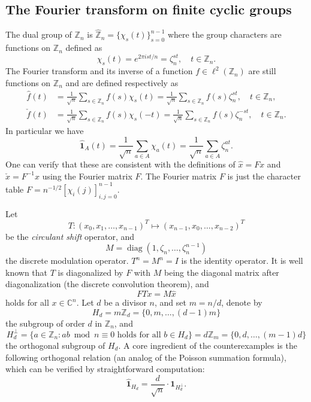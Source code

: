 \documentclass[A4,11pt]{article}
\DeclareMathOperator{\diag}{diag}
\newcommand{\F}[1]{\widehat{\mathbf 1}_{#1}}
\begin{document}
\subsection{The Fourier transform on finite cyclic groups}
The dual group of $\mathbb Z_n$ is $\widehat{\mathbb Z}_n=\{\chi_s(t)\}_{s=0}^{n-1}$ where the group characters are functions on $\mathbb Z_n$ defined as 
$$\chi_s(t)=e^{2\pi i st/n}=\zeta_n^{st}, \quad t\in\mathbb Z_n.$$
The Fourier transform and its inverse of a function $f\in\ell^2(\mathbb Z_n)$ are still functions on $\mathbb Z_n$ and are defined respectively as
\begin{align*}
\hat f(t)&=\frac{1}{\sqrt n}\sum_{s\in\mathbb Z_n}f(s)\chi_s(t)=\frac{1}{\sqrt n}\sum_{s\in\mathbb Z_n}f(s)\zeta_n^{st}, \quad t\in\mathbb Z_n, \\
\check f(t)&=\frac{1}{\sqrt n}\sum_{s\in\mathbb Z_n}f(s)\chi_s(-t)=\frac{1}{\sqrt n}\sum_{s\in\mathbb Z_n}f(s)\zeta_n^{-st}, \quad t\in\mathbb Z_n.
\end{align*}
In particular we have
$$\F{A}(t)=\frac{1}{\sqrt n}\sum_{a\in A}\chi_a(t)=\frac{1}{\sqrt n}\sum_{a\in A}\zeta_n^{at}.$$
One can verify that these are consistent with the definitions of $\hat x=Fx$ and $\check x=F^{-1}x$ using the Fourier matrix $F$. The Fourier matrix $F$ is just the character table $F=n^{-1/2}[\chi_i(j)]_{i,j=0}^{n-1}$.

Let 
$$T:(x_0,x_1,\ldots,x_{n-1})^T\mapsto(x_{n-1},x_0,\ldots,x_{n-2})^T$$ 
be the \emph{circulant shift} operator, and 
$$M=\diag(1,\zeta_n,\ldots,\zeta_n^{n-1})$$ 
the discrete modulation operator. $T^n=M^n=I$ is the identity operator. It is well known that $T$ is diagonalized by $F$ with $M$ being the diagonal matrix after diagonalization (the discrete convolution theorem), and 
\begin{equation} \label{EqTM}
FTx=M\hat x
\end{equation}
holds for all $x\in\mathbb C^n$. Let $d$ be a divisor $n$, and set $m=n/d$, denote by
$$H_d=m\mathbb Z_d=\{0,m,\ldots,(d-1)m\}$$
the subgroup of order $d$ in $\mathbb Z_n$, and 
\begin{equation} \label{EqPerp}
H_d^{\perp}=\{a\in\mathbb Z_n: ab \bmod n\equiv 0 \text{ holds for all } b\in H_d\}=d\mathbb Z_m=\{0,d,\ldots,(m-1)d\}
\end{equation}
the orthogonal subgroup of $H_d$. A core ingredient of the counterexamples is the following orthogonal relation (an analog of the Poisson summation formula), which can be verified by straightforward computation:
\begin{equation} \label{EqPoisson}
\F{H_d}=\frac{d}{\sqrt n}\cdot \mathbf 1_{H_d^{\perp}}. 
\end{equation}
\end{document}
